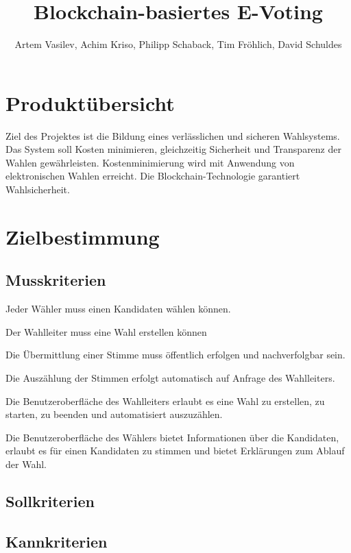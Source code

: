 \documentclass[parskip=full,11pt,twoside]{scrartcl}
\title{Blockchain-basiertes E-Voting}
\author{Artem Vasilev, Achim Kriso, Philipp Schaback, Tim Fröhlich, David Schuldes}
\begin{document}
\maketitle

\pagebreak
\section{Produktübersicht}
Ziel des Projektes ist die Bildung eines verlässlichen und sicheren Wahlsystems. Das System soll Kosten minimieren, gleichzeitig Sicherheit und Transparenz der Wahlen gewährleisten. Kostenminimierung wird mit Anwendung von elektronischen Wahlen erreicht. Die Blockchain-Technologie garantiert Wahlsicherheit.
\section{Zielbestimmung}

\subsection{Musskriterien}

Jeder Wähler muss einen Kandidaten wählen können.

Der Wahlleiter muss eine Wahl erstellen können

Die Übermittlung einer Stimme muss öffentlich erfolgen und nachverfolgbar sein.

Die Auszählung der Stimmen erfolgt automatisch auf Anfrage des Wahlleiters.

Die Benutzeroberfläche des Wahlleiters erlaubt es eine Wahl zu erstellen, zu starten, zu beenden und automatisiert auszuzählen. 

Die Benutzeroberfläche des Wählers bietet Informationen über die Kandidaten, erlaubt es für einen Kandidaten zu stimmen und bietet Erklärungen zum Ablauf der Wahl.

\subsection{Sollkriterien}

\subsection{Kannkriterien}
\end{document}
